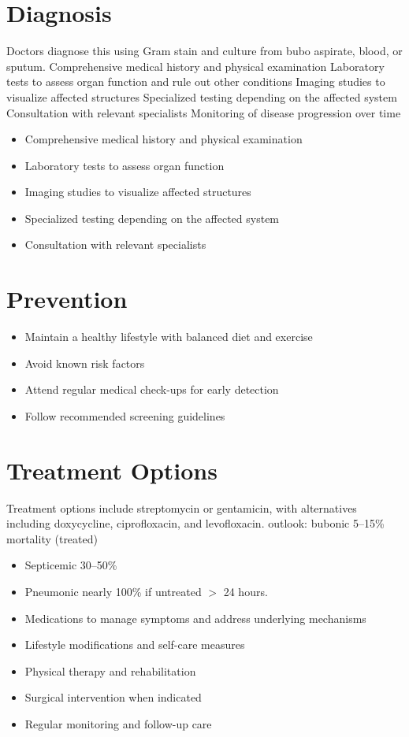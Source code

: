 \section{Diagnosis}
Doctors diagnose this using Gram stain and culture from bubo aspirate, blood, or sputum. Comprehensive medical history and physical examination Laboratory tests to assess organ function and rule out other conditions Imaging studies to visualize affected structures Specialized testing depending on the affected system Consultation with relevant specialists Monitoring of disease progression over time

\begin{itemize}[noitemsep]
  \item Comprehensive medical history and physical examination
  \item Laboratory tests to assess organ function
  \item Imaging studies to visualize affected structures
  \item Specialized testing depending on the affected system
  \item Consultation with relevant specialists
\end{itemize}
\section{Prevention}
\begin{itemize}[noitemsep]
  \item Maintain a healthy lifestyle with balanced diet and exercise
  \item Avoid known risk factors
  \item Attend regular medical check-ups for early detection
  \item Follow recommended screening guidelines
\end{itemize}
\section{Treatment Options}
Treatment options include streptomycin or gentamicin, with alternatives including doxycycline, ciprofloxacin, and levofloxacin. outlook: bubonic 5--15\% mortality (treated)

\begin{itemize}[noitemsep]
  \item Septicemic 30--50\%
  \item Pneumonic nearly 100\% if untreated $>$ 24 hours.
  \item Medications to manage symptoms and address underlying mechanisms
  \item Lifestyle modifications and self-care measures
  \item Physical therapy and rehabilitation
  \item Surgical intervention when indicated
  \item Regular monitoring and follow-up care
\end{itemize}
